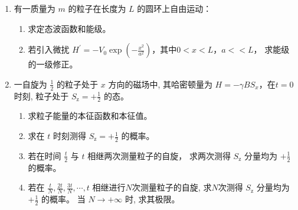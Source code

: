 \begin{enumerate}
\begin{enumerate}
\end{enumerate}





\item 
有一质量为 $m$ 的粒子在长度为 $L$ 的圆环上自由运动：
\begin{enumerate}
	\item
	求定态波函数和能级。
	\item 
	若引入微扰 $H^{\prime}=-V_{0} \exp \left(-\frac{x^{2}}{a^{2}}\right) $，其中$0<x<L$，$ a<<L$， 求能级的一级修正。
	
	
\end{enumerate}

\banswer{
	
}



\newpage
\item 
一自旋为 $\frac{1}{2}$ 的粒子处于 $x$ 方向的磁场中, 其哈密顿量为 $H=-\gamma B S_{x}$，在$ t=0$ 时刻, 粒子处于 $S_{\mathrm{z}}=+\frac{1}{2}$ 的态。
\begin{enumerate}
	\item
求粒子能量的本征函数和本征值。
\item 
 求在 $t$ 时刻测得 $S_{\mathrm{z}}=+\frac{1}{2}$ 的概率。
\item 
若在时间 $\frac{t}{2}$ 与 $t$ 相继两次测量粒子的自旋， 求两次测得 $S_{\mathrm{z}}$ 分量均为 $+\frac{1}{2}$ 的概率。
	
\item 
若在 $\frac{t}{N}, \frac{2 t}{N}, \frac{3 t}{N}, \cdots, t$ 相继进行$ N $次测量粒子的自旋, 求$ N $次测得 $S_{\mathrm{z}}$ 分量均为 $+\frac{1}{2}$ 的概率。 当 $N \rightarrow +\infty$ 时, 求其极限。	
	
\end{enumerate}


\banswer{
	
}




\end{enumerate}
